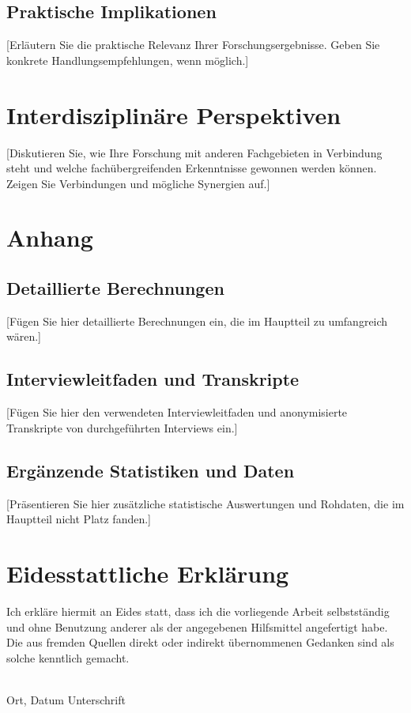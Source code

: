 \documentclass[12pt,a4paper,oneside]{article}
\begin{document}
\subsection{Praktische Implikationen}
[Erläutern Sie die praktische Relevanz Ihrer Forschungsergebnisse. Geben Sie konkrete Handlungsempfehlungen, wenn möglich.]

\clearpage
\section{Interdisziplinäre Perspektiven}
[Diskutieren Sie, wie Ihre Forschung mit anderen Fachgebieten in Verbindung steht und welche fachübergreifenden Erkenntnisse gewonnen werden können. Zeigen Sie Verbindungen und mögliche Synergien auf.]

\clearpage
\printbibliography[title=Literaturverzeichnis]

\clearpage
\appendix
\section{Anhang}
\subsection{Detaillierte Berechnungen}
[Fügen Sie hier detaillierte Berechnungen ein, die im Hauptteil zu umfangreich wären.]

\subsection{Interviewleitfaden und Transkripte}
[Fügen Sie hier den verwendeten Interviewleitfaden und anonymisierte Transkripte von durchgeführten Interviews ein.]

\subsection{Ergänzende Statistiken und Daten}
[Präsentieren Sie hier zusätzliche statistische Auswertungen und Rohdaten, die im Hauptteil nicht Platz fanden.]

\clearpage
\section*{Eidesstattliche Erklärung}
Ich erkläre hiermit an Eides statt, dass ich die vorliegende Arbeit selbstständig und ohne Benutzung anderer als der angegebenen Hilfsmittel angefertigt habe. Die aus fremden Quellen direkt oder indirekt übernommenen Gedanken sind als solche kenntlich gemacht.

\vspace{2cm}
\noindent
\makebox[6cm]{\hrulefill} \hfill \makebox[6cm]{\hrulefill}\\
Ort, Datum \hfill Unterschrift
\end{document}

